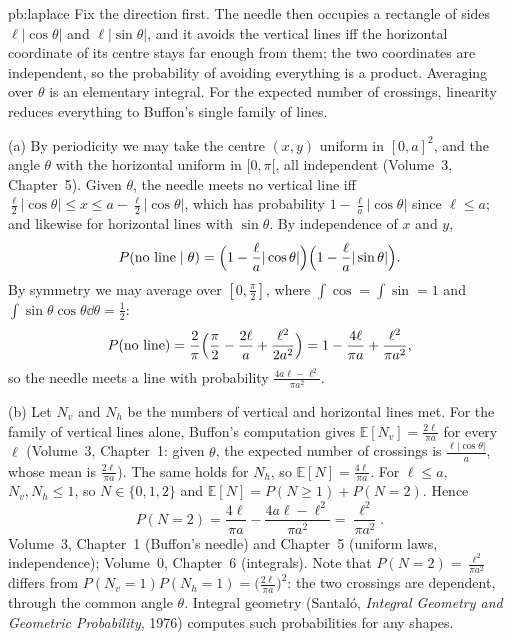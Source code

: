 \begin{solution}{pb:laplace}
\idea Fix the direction first. The needle then occupies a rectangle of sides $\ell|\cos\theta|$ and $\ell|\sin\theta|$, and it
avoids the vertical lines iff the horizontal coordinate of its centre stays far enough from them; the two coordinates are
independent, so the probability of avoiding everything is a product. Averaging over $\theta$ is an elementary integral. For
the expected number of crossings, linearity reduces everything to Buffon's single family of lines.

\writeup (a) By periodicity we may take the centre $(x,y)$ uniform in $[0,a]^2$, and the angle $\theta$ with the horizontal
uniform in $[0,\pi[$, all independent (Volume~3, Chapter~5). Given $\theta$, the needle meets no vertical line iff
$\frac\ell2|\cos\theta|\le x\le a-\frac\ell2|\cos\theta|$, which has probability $1-\frac\ell a|\cos\theta|$ since $\ell\le a$;
and likewise for horizontal lines with $\sin\theta$. By independence of $x$ and $y$,
\[
P(\text{no line}\mid\theta)=\Bigl(1-\frac\ell a|\cos\theta|\Bigr)\Bigl(1-\frac\ell a|\sin\theta|\Bigr).
\]
By symmetry we may average over $[0,\frac\pi2]$, where $\int\cos=\int\sin=1$ and $\int\sin\theta\cos\theta\dd\theta=\frac12$:
\[
P(\text{no line})=\frac2\pi\Bigl(\frac\pi2-\frac{2\ell}a+\frac{\ell^2}{2a^2}\Bigr)=1-\frac{4\ell}{\pi a}+\frac{\ell^2}{\pi a^2},
\]
so the needle meets a line with probability $\frac{4a\ell-\ell^2}{\pi a^2}$.

(b) Let $N_v$ and $N_h$ be the numbers of vertical and horizontal lines met. For the family of vertical lines alone, Buffon's
computation gives $\mathbb E[N_v]=\frac{2\ell}{\pi a}$ for every $\ell$ (Volume~3, Chapter~1: given $\theta$, the expected number of
crossings is $\frac{\ell|\cos\theta|}a$, whose mean is $\frac{2\ell}{\pi a}$). The same holds for $N_h$, so $\mathbb E[N]=
\frac{4\ell}{\pi a}$. For $\ell\le a$, $N_v,N_h\le1$, so $N\in\{0,1,2\}$ and $\mathbb E[N]=P(N\ge1)+P(N=2)$. Hence
\[
P(N=2)=\frac{4\ell}{\pi a}-\frac{4a\ell-\ell^2}{\pi a^2}=\frac{\ell^2}{\pi a^2}.
\]
\tools Volume~3, Chapter~1 (Buffon's needle) and Chapter~5 (uniform laws, independence); Volume~0, Chapter~6 (integrals).
\leads Note that $P(N=2)=\frac{\ell^2}{\pi a^2}$ differs from $P(N_v=1)P(N_h=1)=\bigl(\frac{2\ell}{\pi a}\bigr)^2$: the two
crossings are dependent, through the common angle $\theta$. Integral geometry (Santaló, \emph{Integral Geometry and Geometric Probability}, 1976)
computes such probabilities for any shapes.
\end{solution}

